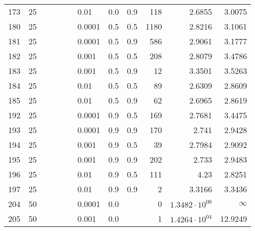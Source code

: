 \begin{longtable}{lrrrrrlrrrrr}
  173 &      25 &   &   &   &   &                        0.01 &      0.0 &    0.9 &     118 &                 2.6855 &                 3.0075 \\
  180 &      25 &   &   &   &   &                      0.0001 &      0.5 &    0.5 &    1180 &                 2.8216 &                 3.1061 \\
  181 &      25 &   &   &   &   &                      0.0001 &      0.5 &    0.9 &     586 &                 2.9061 &                 3.1777 \\
  182 &      25 &   &   &   &   &                       0.001 &      0.5 &    0.5 &     208 &                 2.8079 &                 3.4786 \\
  183 &      25 &   &   &   &   &                       0.001 &      0.5 &    0.9 &      12 &                 3.3501 &                 3.5263 \\
  184 &      25 &   &   &   &   &                        0.01 &      0.5 &    0.5 &      89 &                 2.6309 &                 2.8609 \\
  185 &      25 &   &   &   &   &                        0.01 &      0.5 &    0.9 &      62 &                 2.6965 &                 2.8619 \\
  192 &      25 &   &   &   &   &                      0.0001 &      0.9 &    0.5 &     169 &                 2.7681 &                 3.4475 \\
  193 &      25 &   &   &   &   &                      0.0001 &      0.9 &    0.9 &     170 &                  2.741 &                 2.9428 \\
  194 &      25 &   &   &   &   &                       0.001 &      0.9 &    0.5 &      39 &                 2.7984 &                 2.9092 \\
  195 &      25 &   &   &   &   &                       0.001 &      0.9 &    0.9 &     202 &                  2.733 &                 2.9483 \\
  196 &      25 &   &   &   &   &                        0.01 &      0.9 &    0.5 &     111 &                   4.23 &                 2.8251 \\
  197 &      25 &   &   &   &   &                        0.01 &      0.9 &    0.9 &       2 &                 3.3166 &                 3.3436 \\
  204 &      50 &   &   &   &   &                      0.0001 &      0.0 &        &       0 &  $1.3482\cdot 10^{09}$ &               $\infty$ \\
  205 &      50 &   &   &   &   &                       0.001 &      0.0 &        &       1 &  $1.4264\cdot 10^{04}$ &                12.9249 \\

\end{longtable}
